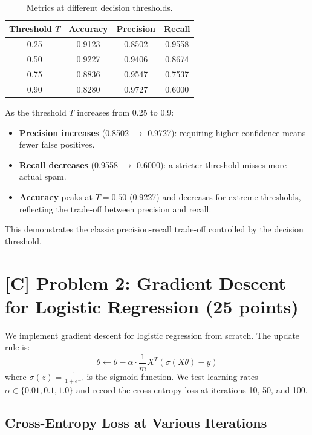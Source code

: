 \documentclass[11pt]{article}
\begin{document}
\begin{table}[h]
\centering
\begin{tabular}{cccc}
\toprule
\textbf{Threshold $T$} & \textbf{Accuracy} & \textbf{Precision} & \textbf{Recall} \\
\midrule
0.25 & 0.9123 & 0.8502 & 0.9558 \\
0.50 & 0.9227 & 0.9406 & 0.8674 \\
0.75 & 0.8836 & 0.9547 & 0.7537 \\
0.90 & 0.8280 & 0.9727 & 0.6000 \\
\bottomrule
\end{tabular}
\caption{Metrics at different decision thresholds.}
\end{table}

As the threshold $T$ increases from 0.25 to 0.9:
\begin{itemize}
    \item \textbf{Precision increases} (0.8502 $\to$ 0.9727): requiring higher confidence means fewer false positives.
    \item \textbf{Recall decreases} (0.9558 $\to$ 0.6000): a stricter threshold misses more actual spam.
    \item \textbf{Accuracy} peaks at $T=0.50$ (0.9227) and decreases for extreme thresholds, reflecting the trade-off between precision and recall.
\end{itemize}
This demonstrates the classic precision-recall trade-off controlled by the decision threshold.

\section*{[C] Problem 2: Gradient Descent for Logistic Regression (25 points)}

We implement gradient descent for logistic regression from scratch. The update rule is:
\[
\theta \leftarrow \theta - \alpha \cdot \frac{1}{m} X^T(\sigma(X\theta) - y)
\]
where $\sigma(z) = \frac{1}{1+e^{-z}}$ is the sigmoid function. We test learning rates $\alpha \in \{0.01, 0.1, 1.0\}$ and record the cross-entropy loss at iterations 10, 50, and 100.

\subsection*{Cross-Entropy Loss at Various Iterations}
\end{document}
